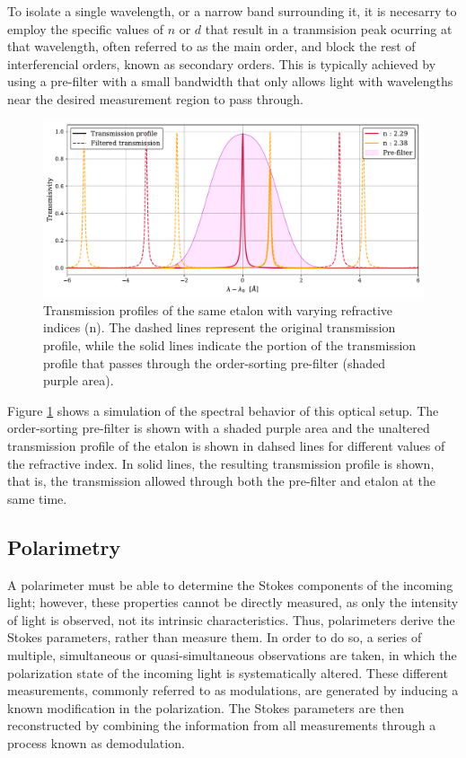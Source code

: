 To isolate a single wavelength, or a narrow band surrounding it, it is necesarry to employ the specific values of $n$ or $d$ that result in a tranmsision peak ocurring at that wavelength, often referred to as the main order, and block the rest of interferencial orders, known as secondary orders. This is typically achieved by using a pre-filter with a small bandwidth that only allows light with wavelengths near the desired measurement region to pass through. 

\begin{figure}
  \centering
  \includegraphics[width = \textwidth]{figures/Introduction_to_spectropolarimeters/Etalon_and_prefilter_example.pdf}
  \caption[Etalon's transmission profiles and prefilter.]{Transmission profiles of the same etalon with varying refractive indices (n). The dashed lines represent the original transmission profile, while the solid lines indicate the portion of the transmission profile that passes through the order-sorting pre-filter (shaded purple area).} 
  \label{fig_ch2: etalon_example}
\end{figure}

Figure \ref{fig_ch2: etalon_example} shows a simulation of the spectral behavior of this optical setup. The order-sorting pre-filter is shown with a shaded purple area and the unaltered transmission profile of the etalon is shown in dahsed lines for different values of the refractive index. In solid lines, the resulting transmission profile is shown, that is, the transmission allowed through both the pre-filter and etalon at the same time. 

\subsection{Polarimetry}

A polarimeter must be able to determine the Stokes components of the incoming light; however, these properties cannot be directly measured, as only the intensity of light is observed, not its intrinsic characteristics. Thus, polarimeters derive the Stokes parameters, rather than measure them. In order to do so, a series of multiple, simultaneous or quasi-simultaneous observations are taken, in which the polarization state of the incoming light is systematically altered. These different measurements, commonly referred to as modulations, are generated by inducing a known modification in the polarization. The Stokes parameters are then reconstructed by combining the information from all measurements through a process known as demodulation.

